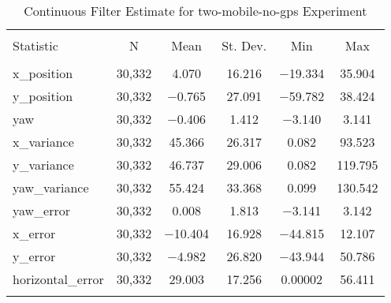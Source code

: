 
\begin{table}[h] \centering 
  \caption{Continuous Filter Estimate for two-mobile-no-gps Experiment} 
  \label{tab:two_mobile_no_gps_continuous_summary} 
\begin{tabular}{@{\extracolsep{5pt}}lccccc} 
\\[-1.8ex]\hline 
\hline \\[-1.8ex] 
Statistic & \multicolumn{1}{c}{N} & \multicolumn{1}{c}{Mean} & \multicolumn{1}{c}{St. Dev.} & \multicolumn{1}{c}{Min} & \multicolumn{1}{c}{Max} \\ 
\hline \\[-1.8ex] 
x\_position & 30,332 & \num{4.070} & \num{16.216} & $-$19.334 & \num{35.904} \\ 
y\_position & 30,332 & $-$0.765 & \num{27.091} & $-$59.782 & \num{38.424} \\ 
yaw & 30,332 & $-$0.406 & \num{1.412} & $-$3.140 & \num{3.141} \\ 
x\_variance & 30,332 & \num{45.366} & \num{26.317} & \num{0.082} & \num{93.523} \\ 
y\_variance & 30,332 & \num{46.737} & \num{29.006} & \num{0.082} & \num{119.795} \\ 
yaw\_variance & 30,332 & \num{55.424} & \num{33.368} & \num{0.099} & \num{130.542} \\ 
yaw\_error & 30,332 & \num{0.008} & \num{1.813} & $-$3.141 & \num{3.142} \\ 
x\_error & 30,332 & $-$10.404 & \num{16.928} & $-$44.815 & \num{12.107} \\ 
y\_error & 30,332 & $-$4.982 & \num{26.820} & $-$43.944 & \num{50.786} \\ 
horizontal\_error & 30,332 & \num{29.003} & \num{17.256} & \num{0.00002} & \num{56.411} \\ 
\hline \\[-1.8ex] 
\end{tabular} 
\end{table} 
